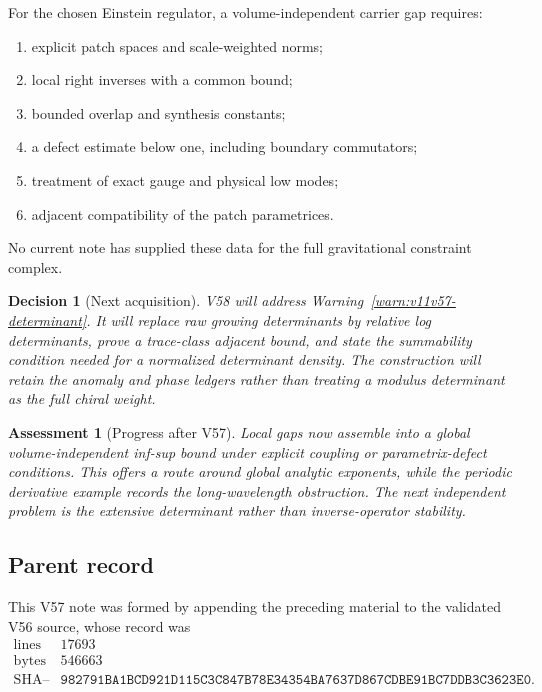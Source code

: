 \documentclass[11pt]{article}
\newtheorem{assessment}[theorem]{Assessment}
\newtheorem{decision}[theorem]{Decision}
\begin{document}
\begin{ledger}
\label{led:v11v57-locality}
For the chosen Einstein regulator, a volume-independent carrier gap
requires:
\begin{enumerate}
\item explicit patch spaces and scale-weighted norms;
\item local right inverses with a common bound;
\item bounded overlap and synthesis constants;
\item a defect estimate below one, including boundary commutators;
\item treatment of exact gauge and physical low modes;
\item adjacent compatibility of the patch parametrices.
\end{enumerate}
No current note has supplied these data for the full gravitational
constraint complex.
\end{ledger}

\begin{decision}[Next acquisition]
\label{dec:v11v57-next}
V58 will address Warning~\ref{warn:v11v57-determinant}.  It will replace
raw growing determinants by relative log determinants, prove a
trace-class adjacent bound, and state the summability condition needed
for a normalized determinant density.  The construction will retain
the anomaly and phase ledgers rather than treating a modulus
determinant as the full chiral weight.
\end{decision}

\begin{assessment}[Progress after V57]
\label{ass:v11v57-status}
Local gaps now assemble into a global volume-independent inf-sup bound
under explicit coupling or parametrix-defect conditions.  This offers
a route around global analytic exponents, while the periodic derivative
example records the long-wavelength obstruction.  The next independent
problem is the extensive determinant rather than inverse-operator
stability.
\end{assessment}

\subsection{Parent record}

This V57 note was formed by appending the preceding material to the
validated V56 source, whose record was
\[
\begin{array}{c|c}
\text{lines}&17693\\
\text{bytes}&546663\\
\text{SHA--256}&
\texttt{982791BA1BCD921D115C3C847B78E34354BA7637D867CDBE91BC7DDB3C3623E0}.
\end{array}                                                     \tag{57.20}
\]
\end{document}
